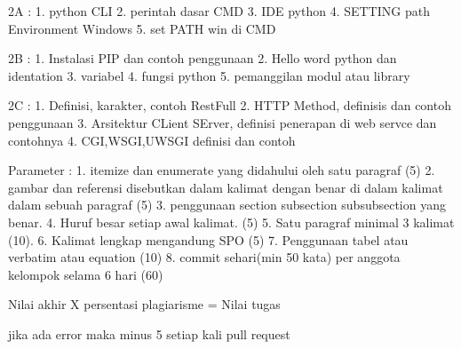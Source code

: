2A :
1. python CLI
2. perintah dasar CMD
3. IDE python
4. SETTING path Environment Windows
5. set PATH win di CMD


2B :
1. Instalasi PIP dan contoh penggunaan
2. Hello word python dan identation
3. variabel
4. fungsi python
5. pemanggilan modul atau library

2C :
1. Definisi, karakter, contoh RestFull
2. HTTP Method, definisis dan contoh penggunaan
3. Arsitektur CLient SErver, definisi penerapan di web servce dan contohnya
4. CGI,WSGI,UWSGI definisi dan contoh



Parameter :
1. itemize dan enumerate yang didahului oleh satu paragraf (5)
2. gambar dan referensi disebutkan dalam kalimat dengan benar di dalam kalimat dalam sebuah paragraf (5)
3. penggunaan section subsection subsubsection yang benar. 
4. Huruf besar setiap awal kalimat. (5)
5. Satu paragraf minimal 3 kalimat (10).
6. Kalimat lengkap mengandung SPO (5)
7. Penggunaan tabel atau verbatim atau equation (10)
8. commit sehari(min 50 kata) per anggota kelompok selama 6 hari (60)

Nilai akhir X persentasi plagiarisme = Nilai tugas


jika ada error maka minus 5 setiap kali pull request